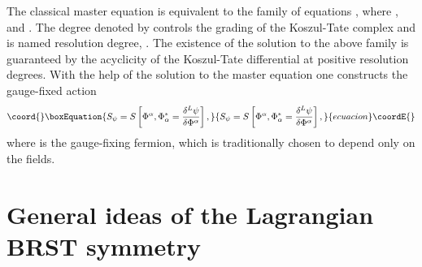 \documentclass[a4paper,12pt]{article}
\begin{document}
The classical master equation is equivalent to the family of equations \coordHE{}, where \coordHE{}, \coordHE{} and \coordHE{}. The degree denoted by \coordHE{}
controls the grading of the Koszul-Tate complex and is named resolution
degree, \coordHE{}. The existence of the
solution to the above family is guaranteed by the acyclicity of the
Koszul-Tate differential at positive resolution degrees. With the help of
the solution to the master equation one constructs the gauge-fixed action 
\begin{equation}\coord{}\boxEquation{
S_{\psi }=S\left[ \Phi ^{\alpha },\Phi _{\alpha }^{*}=\frac{\delta ^{L}\psi 
}{\delta \Phi ^{\alpha }}\right] ,  \label{sp3.d5}
}{
S_{\psi }=S\left[ \Phi ^{\alpha },\Phi _{\alpha }^{*}=\frac{\delta ^{L}\psi 
}{\delta \Phi ^{\alpha }}\right] ,  }{ecuacion}\coordE{}\end{equation}
where \myHighlight{$\psi \left[ \Phi ^{\alpha }\right] $}\coordHE{} is the gauge-fixing fermion,
which is traditionally chosen to depend only on the fields.

\section{General ideas of the Lagrangian \coordHE{} BRST symmetry}
\end{document}

